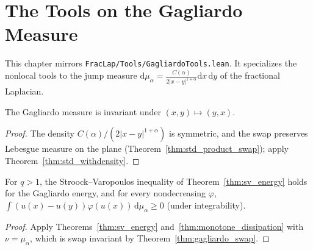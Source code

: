 \chapter{The Tools on the Gagliardo Measure}

This chapter mirrors \texttt{FracLap/Tools/GagliardoTools.lean}. It specializes the nonlocal tools to the jump measure $\mathrm{d}\mu_\alpha = \frac{C(\alpha)}{2 \lvert x - y \rvert^{1+\alpha}} \mathrm{d}x\, \mathrm{d}y$ of the fractional Laplacian.

\begin{theorem}\label{thm:gagliardo_swap}
\leanok
The Gagliardo measure is invariant under $(x, y) \mapsto (y, x)$.
\end{theorem}

\begin{proof}
\leanok
The density $C(\alpha) / (2 \lvert x - y \rvert^{1+\alpha})$ is symmetric, and the swap preserves Lebesgue measure on the plane (Theorem~\ref{thm:std_product_swap}); apply Theorem~\ref{thm:std_withdensity}.
\end{proof}

\begin{theorem}\label{thm:gagliardo_tools}
\leanok
For $q > 1$, the Stroock--Varopoulos inequality of Theorem~\ref{thm:sv_energy} holds for the Gagliardo energy, and for every nondecreasing $\varphi$, $\int (u(x) - u(y)) \varphi(u(x))\, \mathrm{d}\mu_\alpha \ge 0$ (under integrability).
\end{theorem}

\begin{proof}
\leanok
Apply Theorems~\ref{thm:sv_energy} and~\ref{thm:monotone_dissipation} with $\nu = \mu_\alpha$, which is swap invariant by Theorem~\ref{thm:gagliardo_swap}.
\end{proof}
